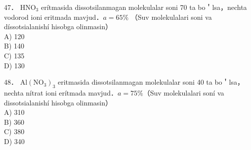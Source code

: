 47． $\mathrm{HNO}_{3}$ erítmasida dissotsilanmagan molekulalar soni 70 ta bo＇lsa，nechta vodorod ioni eritmada mavjud．$a=65 \%$ （Suv molekulalari soni va díssotsialanishí hisobga olinmasin）\\
A) 120\\
B) 140\\
C) 135\\
D) 130

48． $\mathrm{Al}\left(\mathrm{NO}_{3}\right)_{3}$ eritmasida dissotsilanmagan molekulalar soni 40 ta bo＇lsa，nechta nítrat ioni erítmada mavjud．$a=75 \%$（Suv molekulalari soní va dissotsialanishí hisobga olinmasin）\\
A) 310\\
B) 360\\
C) 380\\
D) 340

